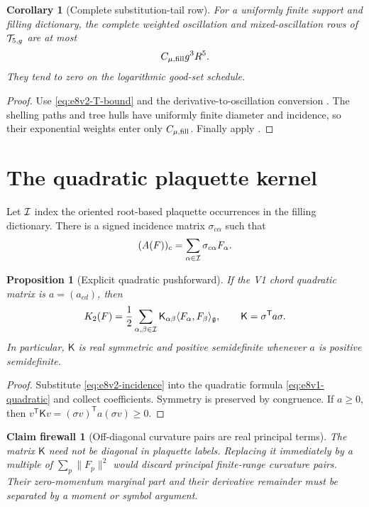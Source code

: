 \documentclass[11pt,oneside]{book}
\newtheorem{proposition}[theorem]{Proposition}
\newtheorem{corollary}[theorem]{Corollary}
\newtheorem{firewall}[theorem]{Claim firewall}
\theoremstyle{definition}
\theoremstyle{remark}
\begin{document}
\begin{corollary}[Complete substitution-tail row]
\label{cor:e8v2-tail}
For a uniformly finite support and filling dictionary, the complete
weighted oscillation and mixed-oscillation rows of
\({\cal T}_{5,g}\) are at most
\[
 C_{\mu,\rm fill}g^3R^5.                             \label{eq:e8v2-tail}
\]
They tend to zero on the logarithmic good-set schedule.
\end{corollary}

\begin{proof}
Use \eqref{eq:e8v2-T-bound} and the
derivative-to-oscillation conversion
.  The shelling paths and tree hulls have
uniformly finite diameter and incidence, so their exponential weights
enter only \(C_{\mu,\rm fill}\).  Finally apply
.
\end{proof}

\section{The quadratic plaquette kernel}
\label{sec:e8v2-quadratic}

Let \({\cal I}\) index the oriented root-based plaquette occurrences
in the filling dictionary.  There is a signed incidence matrix
\(\sigma_{c\alpha}\) such that
\[
 (A(F))_c=\sum_{\alpha\in{\cal I}}\sigma_{c\alpha}F_\alpha.
                                                        \label{eq:e8v2-incidence}
\]

\begin{proposition}[Explicit quadratic pushforward]
\label{prop:e8v2-quadratic}
If the V1 chord quadratic matrix is \(a=(a_{cd})\), then
\[
 K_2(F)
 =
 \frac12
 \sum_{\alpha,\beta\in{\cal I}}
 {\mathsf K}_{\alpha\beta}
 \langle F_\alpha,F_\beta\rangle_{\mathfrak g},
 \qquad
 {\mathsf K}=\sigma^{\mathsf T}a\sigma.              \label{eq:e8v2-Kmatrix}
\]
In particular, \({\mathsf K}\) is real symmetric and positive
semidefinite whenever \(a\) is positive semidefinite.
\end{proposition}

\begin{proof}
Substitute \eqref{eq:e8v2-incidence} into the quadratic formula
\eqref{eq:e8v1-quadratic} and collect coefficients.  Symmetry is
preserved by congruence.  If \(a\geq0\), then
\(v^{\mathsf T}{\mathsf K}v=(\sigma v)^{\mathsf T}
a(\sigma v)\geq0\).
\end{proof}

\begin{firewall}[Off-diagonal curvature pairs are real principal
terms]
\label{fire:e8v2-offdiagonal}
The matrix \({\mathsf K}\) need not be diagonal in plaquette labels.
Replacing it immediately by a multiple of
\(\sum_p\|F_p\|^2\) would discard principal finite-range curvature
pairs.  Their zero-momentum marginal part and their derivative
remainder must be separated by a moment or symbol argument.
\end{firewall}
\end{document}
